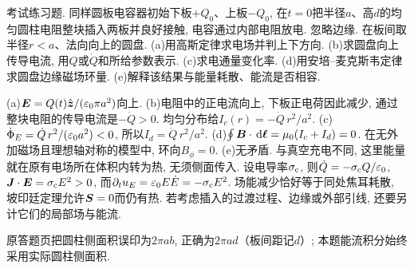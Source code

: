 \begin{exercise}
考试练习题. 同样圆板电容器初始下板$+Q_0$、上板$-Q_0$, 在$t=0$把半径$a$、高$d$的均匀圆柱电阻整块插入两板并良好接触, 电容通过内部电阻放电. 忽略边缘. 在板间取半径$r<a$、法向向上的圆盘.
(a)用高斯定律求电场并判上下方向.
(b)求圆盘向上传导电流, 用$Q$或$\dot Q$和所给参数表示.
(c)求电通量变化率.
(d)用安培--麦克斯韦定律求圆盘边缘磁场环量.
(e)解释该结果与能量耗散、能流是否相容.
\end{exercise}
\begin{solution}
(a)$\boldsymbol{E}=Q(t)\hat{\boldsymbol{z}}/(\varepsilon_0\pi a^2)$向上.
(b)电阻中的正电流向上, 下板正电荷因此减少, 通过整块电阻的传导电流是$-\dot Q>0$. 均匀分布给$I_c(r)=-\dot Q\,r^2/a^2$.
(c)$\dot\Phi_E=\dot Q\,r^2/(\varepsilon_0 a^2)<0$, 所以$I_d=\dot Q\,r^2/a^2$.
(d)$\oint\boldsymbol{B}\cdot\,\mathrm d\boldsymbol{\ell}=\mu_0(I_c+I_d)=0$. 在无外加磁场且理想轴对称的模型中, 环向$B_\phi=0$.
(e)无矛盾. 与真空充电不同, 这里能量就在原有电场所在体积内转为热, 无须侧面传入. 设电导率$\sigma_{\rm c}$, 则$\dot Q=-\sigma_{\rm c}Q/\varepsilon_0$, $\boldsymbol{J}\cdot\boldsymbol{E}=\sigma_{\rm c}E^2>0$, 而$\partial_tu_E=\varepsilon_0 E\dot E=-\sigma_{\rm c}E^2$. 场能减少恰好等于同处焦耳耗散, 坡印廷定理允许$\boldsymbol{S}=0$而仍有热. 若考虑插入的过渡过程、边缘或外部引线, 还要另计它们的局部场与能流.
\end{solution}

原答题页把圆柱侧面积误印为$2\pi ab$, 正确为$2\pi ad$（板间距记$d$）; 本题能流积分始终采用实际圆柱侧面积.
